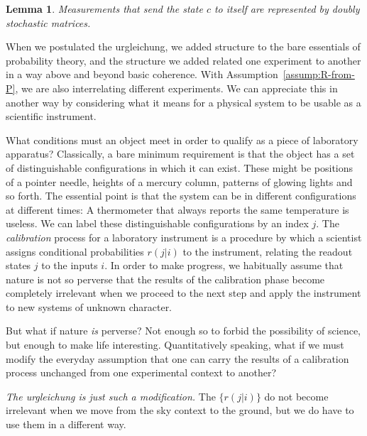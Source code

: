 \documentclass[aps,pra,superscriptaddress,10pt,tightenlines,twocolumn,nofootinbib]{revtex4}
\newtheorem{lemma}[theorem]{Lemma}
\theoremstyle{remark}
\begin{document}
\begin{lemma}
\label{lm:doubly-stochastic}
Measurements that send the state $c$ to itself are represented by doubly stochastic matrices.
\end{lemma}

When we postulated the urgleichung, we added structure to the bare
essentials of probability theory, and the structure we added related
one experiment to another in a way above and beyond basic coherence.
With Assumption~\ref{assump:R-from-P}, we are also interrelating
different experiments.  We can appreciate this in another way by
considering what it means for a physical system to be usable as a
scientific instrument.

What conditions must an object meet in order to qualify as a piece of
laboratory apparatus?  Classically, a bare minimum requirement is that
the object has a set of distinguishable configurations in which it can
exist.  These might be positions of a pointer needle, heights of a
mercury column, patterns of glowing lights and so forth.  The
essential point is that the system can be in different configurations
at different times: A thermometer that always reports the same
temperature is useless.  We can label these distinguishable
configurations by an index $j$.  The \emph{calibration} process for a
laboratory instrument is a procedure by which a scientist assigns
conditional probabilities $r(j|i)$ to the instrument, relating the
readout states $j$ to the inputs $i$.  In order to make progress, we
habitually assume that nature is not so perverse that the results of
the calibration phase become completely irrelevant when we proceed to
the next step and apply the instrument to new systems of unknown
character.

But what if nature \emph{is} perverse?  Not enough so to forbid the
possibility of science, but enough to make life interesting.
Quantitatively speaking, what if we must modify the everyday
assumption that one can carry the results of a calibration process
unchanged from one experimental context to another?

\emph{The urgleichung is just such a modification.}  The $\{r(j|i)\}$
do not become irrelevant when we move from the sky context to the
ground, but we do have to use them in a different way.
\end{document}
